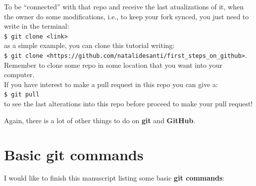 \documentclass[12pt,a4paper,titlepage,brazil]{article}
\begin{document}
{To be ``connected'' with that repo and receive the last atualizations of it, when the owner do some modifications, i.e., to keep your fork synced, you just need to write in the terminal:\\

\texttt{\$ git clone <link>}\\

as a simple example, you can clone this tutorial writing:\\

\texttt{\$ git clone <https://github.com/natalidesanti/first\_steps\_on\_github>}.\\

Remember to clone some repo in some location that you want into your computer.\\

If you have interest to make a pull request in this repo you can give a:\\

\texttt{\$ git pull}\\

to see the last alterations into this repo before proceed to make your pull request!


Again, there is a lot of other things to do on {\bf git} and {\bf GitHub}.


\section{Basic git commands}

I would like to finish this manuscript listing some basic {\bf git commands}:

}
\end{document}
